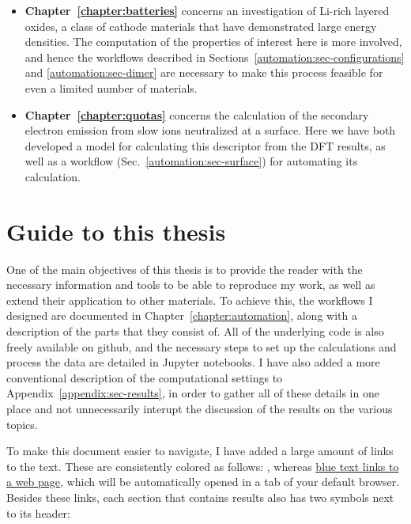\begin{refsection}
\begin{itemize}[]
\item \textbf{Chapter~\ref{chapter:batteries}} concerns an investigation of Li-rich layered oxides, a class of cathode materials that have demonstrated large energy densities. The computation of the properties of interest here is more involved, and hence the workflows described in Sections~\ref{automation:sec-configurations} and \ref{automation:sec-dimer} are necessary to make this process feasible for even a limited number of materials.

\item \textbf{Chapter~\ref{chapter:quotas}} concerns the calculation of the secondary electron emission from slow ions neutralized at a surface. Here we have both developed a model for calculating this descriptor from the DFT results, as well as a workflow (Sec.~\ref{automation:sec-surface}) for automating its calculation.

\end{itemize}

\section{Guide to this thesis} \label{intro:sec-guide}

One of the main objectives of this thesis is to provide the reader with the necessary information and tools to be able to reproduce my work, as well as extend their application to other materials. To achieve this, the workflows I designed are documented in Chapter~\ref{chapter:automation}, along with a description of the parts that they consist of. All of the underlying code is also freely available on github, and the necessary steps to set up the calculations and process the data are detailed in Jupyter notebooks. I have also added a more conventional description of the computational settings to Appendix~\ref{appendix:sec-results}, in order to gather all of these details in one place and not unnecessarily interupt the discussion of the results on the various topics.

To make this document easier to navigate, I have added a large amount of links to the text. These are consistently colored as follows: , whereas \href{https://github.com/mbercx/phd-thesis}{blue text links to a web page}, which will be automatically opened in a tab of your default browser. Besides these links, each section that contains results also has two symbols next to its header:


\end{refsection}
